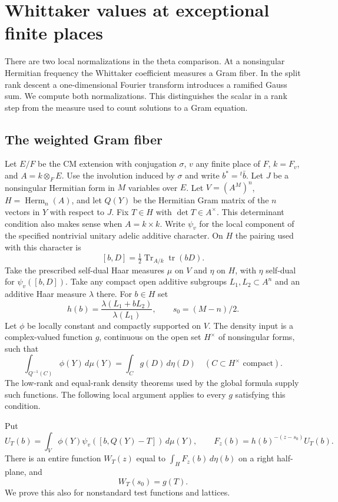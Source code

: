 \section{Whittaker values at exceptional finite places}
\label{sec:ramified-whittaker}

There are two local normalizations in the theta comparison. At a
nonsingular Hermitian frequency the Whittaker coefficient measures a
Gram fiber. In the split rank descent a one-dimensional Fourier
transform introduces a ramified Gauss sum. We compute both
normalizations. This distinguishes the scalar in a rank step from
the measure used to count solutions to a Gram equation.

\subsection{The weighted Gram fiber}

Let \(E/F\) be the CM extension with conjugation \(\sigma\), \(v\) any
finite place of \(F\), \(k=F_v\), and \(A=k\otimes_F E\). Use the
involution induced by \(\sigma\) and write \(b^*={}^{t}\bar b\).
Let \(J\) be a nonsingular Hermitian form in \(M\) variables over
\(E\). Let \(V=(A^M)^n\), \(H=\operatorname{Herm}_n(A)\), and let
\(Q(Y)\) be the Hermitian Gram matrix of the \(n\) vectors in \(Y\)
with respect to \(J\). Fix \(T\in H\) with \(\det T\in A^\times\).
This determinant condition also makes sense when \(A=k\times k\).
Write \(\psi_v\) for the local component of the specified nontrivial
unitary adelic additive character. On \(H\) the pairing used with
this character is
\[
 [b,D]=\tfrac12\operatorname{Tr}_{A/k}\operatorname{tr}(bD).
\]
Take the prescribed self-dual Haar measures \(\mu\) on \(V\) and
\(\eta\) on \(H\), with \(\eta\) self-dual for \(\psi_v([b,D])\).
Take any compact open additive subgroups \(L_1,L_2\subset A^n\) and
an additive Haar measure \(\lambda\) there. For \(b\in H\) set
\[
 h(b)=\frac{\lambda(L_1+bL_2)}{\lambda(L_1)},\qquad
 s_0=(M-n)/2 .
\]
Let \(\phi\) be locally constant and compactly supported on \(V\).
The density input is a complex-valued function \(g\), continuous on
the open set \(H^\times\) of nonsingular forms, such that
\[
 \int_{Q^{-1}(C)}\phi(Y)\,d\mu(Y)=\int_Cg(D)\,d\eta(D)
 \quad(C\subset H^\times\text{ compact}).
\]
The low-rank and equal-rank density theorems used by the global
formula supply such functions. The following local argument applies
to every \(g\) satisfying this condition.

Put
\[
 U_T(b)=\int_V\phi(Y)\psi_v([b,Q(Y)-T])\,d\mu(Y),
 \qquad F_z(b)=h(b)^{-(z-s_0)}U_T(b).
\]
There is an entire function \(W_T(z)\) equal to
\(\int_H F_z(b)\,d\eta(b)\) on a right half-plane, and
\begin{equation}
                       W_T(s_0)=g(T).
 \label{eq:exceptional-whit-density}
\end{equation}
We prove this also for nonstandard test functions and lattices.

